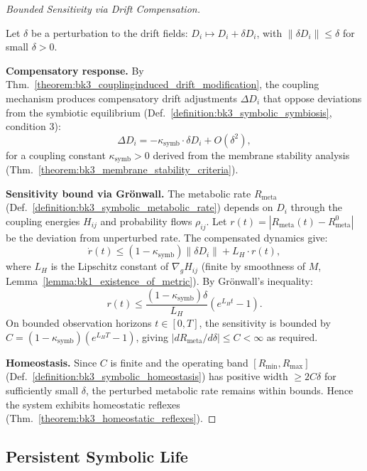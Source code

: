 \begin{proof}[Bounded Sensitivity via Drift Compensation]
\label{proof:bk3_sketch_field_perturbation}
\leavevmode

Let $\delta$ be a perturbation to the drift fields: $D_i \mapsto D_i + \delta D_i$,
with $\|\delta D_i\| \leq \delta$ for small $\delta > 0$.

\textbf{Compensatory response.}
By Thm.~\ref{theorem:bk3_couplinginduced_drift_modification}, the coupling mechanism
produces compensatory drift adjustments $\Delta D_i$ that oppose deviations from the
symbiotic equilibrium (Def.~\ref{definition:bk3_symbolic_symbiosis}, condition 3):
\[
\Delta D_i = -\kappa_{\text{symb}} \cdot \delta D_i + O(\delta^2),
\]
for a coupling constant $\kappa_{\text{symb}} > 0$ derived from the membrane stability
analysis (Thm.~\ref{theorem:bk3_membrane_stability_criteria}).

\textbf{Sensitivity bound via Grönwall.}
The metabolic rate $R_{\text{meta}}$ (Def.~\ref{definition:bk3_symbolic_metabolic_rate})
depends on $D_i$ through the coupling energies $H_{ij}$ and probability flows $\rho_{ij}$.
Let $r(t) = |R_{\text{meta}}(t) - R_{\text{meta}}^0|$ be the deviation from unperturbed
rate. The compensated dynamics give:
\[
\dot{r}(t) \leq (1 - \kappa_{\text{symb}})\|\delta D_i\| + L_H\cdot r(t),
\]
where $L_H$ is the Lipschitz constant of $\nabla_g H_{ij}$ (finite by smoothness of $M$,
Lemma~\ref{lemma:bk1_existence_of_metric}). By Grönwall's inequality:
\[
r(t) \leq \frac{(1-\kappa_{\text{symb}})\delta}{L_H}(e^{L_H t} - 1).
\]
On bounded observation horizons $t \in [0,T]$, the sensitivity is bounded by
$C = (1-\kappa_{\text{symb}})(e^{L_H T}-1)$, giving
$|dR_{\text{meta}}/d\delta| \leq C < \infty$ as required.

\textbf{Homeostasis.}
Since $C$ is finite and the operating band $[R_{\text{min}}, R_{\text{max}}]$
(Def.~\ref{definition:bk3_symbolic_homeostasis}) has positive width $\geq 2C\delta$
for sufficiently small $\delta$, the perturbed metabolic rate remains within bounds.
Hence the system exhibits homeostatic reflexes (Thm.~\ref{theorem:bk3_homeostatic_reflexes}).
\end{proof}

\subsection{Persistent Symbolic Life}

